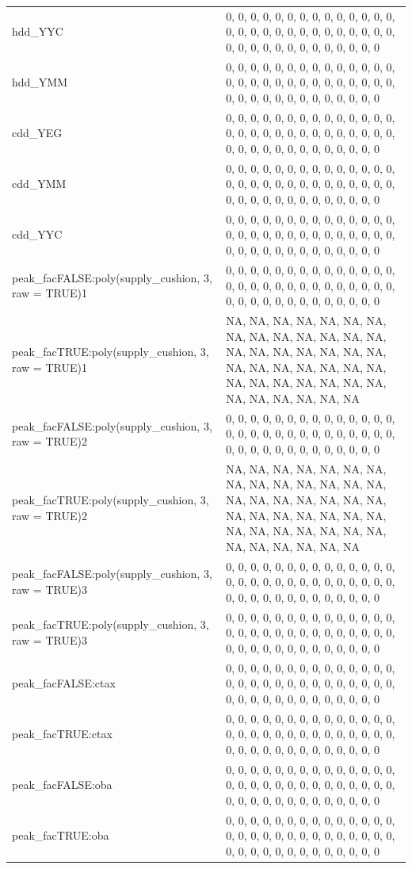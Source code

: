 \begin{table}
{\begin{tabular}[t]{ll}
hdd\_YYC & 0, 0, 0, 0, 0, 0, 0, 0, 0, 0, 0, 0, 0, 0, 0, 0, 0, 0, 0, 0, 0, 0, 0, 0, 0, 0, 0, 0, 0, 0, 0, 0, 0, 0, 0, 0, 0, 0, 0, 0, 0\\
hdd\_YMM & 0, 0, 0, 0, 0, 0, 0, 0, 0, 0, 0, 0, 0, 0, 0, 0, 0, 0, 0, 0, 0, 0, 0, 0, 0, 0, 0, 0, 0, 0, 0, 0, 0, 0, 0, 0, 0, 0, 0, 0, 0\\
cdd\_YEG & 0, 0, 0, 0, 0, 0, 0, 0, 0, 0, 0, 0, 0, 0, 0, 0, 0, 0, 0, 0, 0, 0, 0, 0, 0, 0, 0, 0, 0, 0, 0, 0, 0, 0, 0, 0, 0, 0, 0, 0, 0\\
cdd\_YMM & 0, 0, 0, 0, 0, 0, 0, 0, 0, 0, 0, 0, 0, 0, 0, 0, 0, 0, 0, 0, 0, 0, 0, 0, 0, 0, 0, 0, 0, 0, 0, 0, 0, 0, 0, 0, 0, 0, 0, 0, 0\\
\addlinespace
cdd\_YYC & 0, 0, 0, 0, 0, 0, 0, 0, 0, 0, 0, 0, 0, 0, 0, 0, 0, 0, 0, 0, 0, 0, 0, 0, 0, 0, 0, 0, 0, 0, 0, 0, 0, 0, 0, 0, 0, 0, 0, 0, 0\\
peak\_facFALSE:poly(supply\_cushion, 3, raw = TRUE)1 & 0, 0, 0, 0, 0, 0, 0, 0, 0, 0, 0, 0, 0, 0, 0, 0, 0, 0, 0, 0, 0, 0, 0, 0, 0, 0, 0, 0, 0, 0, 0, 0, 0, 0, 0, 0, 0, 0, 0, 0, 0\\
peak\_facTRUE:poly(supply\_cushion, 3, raw = TRUE)1 & NA, NA, NA, NA, NA, NA, NA, NA, NA, NA, NA, NA, NA, NA, NA, NA, NA, NA, NA, NA, NA, NA, NA, NA, NA, NA, NA, NA, NA, NA, NA, NA, NA, NA, NA, NA, NA, NA, NA, NA, NA\\
peak\_facFALSE:poly(supply\_cushion, 3, raw = TRUE)2 & 0, 0, 0, 0, 0, 0, 0, 0, 0, 0, 0, 0, 0, 0, 0, 0, 0, 0, 0, 0, 0, 0, 0, 0, 0, 0, 0, 0, 0, 0, 0, 0, 0, 0, 0, 0, 0, 0, 0, 0, 0\\
peak\_facTRUE:poly(supply\_cushion, 3, raw = TRUE)2 & NA, NA, NA, NA, NA, NA, NA, NA, NA, NA, NA, NA, NA, NA, NA, NA, NA, NA, NA, NA, NA, NA, NA, NA, NA, NA, NA, NA, NA, NA, NA, NA, NA, NA, NA, NA, NA, NA, NA, NA, NA\\
\addlinespace
peak\_facFALSE:poly(supply\_cushion, 3, raw = TRUE)3 & 0, 0, 0, 0, 0, 0, 0, 0, 0, 0, 0, 0, 0, 0, 0, 0, 0, 0, 0, 0, 0, 0, 0, 0, 0, 0, 0, 0, 0, 0, 0, 0, 0, 0, 0, 0, 0, 0, 0, 0, 0\\
peak\_facTRUE:poly(supply\_cushion, 3, raw = TRUE)3 & 0, 0, 0, 0, 0, 0, 0, 0, 0, 0, 0, 0, 0, 0, 0, 0, 0, 0, 0, 0, 0, 0, 0, 0, 0, 0, 0, 0, 0, 0, 0, 0, 0, 0, 0, 0, 0, 0, 0, 0, 0\\
peak\_facFALSE:ctax & 0, 0, 0, 0, 0, 0, 0, 0, 0, 0, 0, 0, 0, 0, 0, 0, 0, 0, 0, 0, 0, 0, 0, 0, 0, 0, 0, 0, 0, 0, 0, 0, 0, 0, 0, 0, 0, 0, 0, 0, 0\\
peak\_facTRUE:ctax & 0, 0, 0, 0, 0, 0, 0, 0, 0, 0, 0, 0, 0, 0, 0, 0, 0, 0, 0, 0, 0, 0, 0, 0, 0, 0, 0, 0, 0, 0, 0, 0, 0, 0, 0, 0, 0, 0, 0, 0, 0\\
peak\_facFALSE:oba & 0, 0, 0, 0, 0, 0, 0, 0, 0, 0, 0, 0, 0, 0, 0, 0, 0, 0, 0, 0, 0, 0, 0, 0, 0, 0, 0, 0, 0, 0, 0, 0, 0, 0, 0, 0, 0, 0, 0, 0, 0\\
\addlinespace
peak\_facTRUE:oba & 0, 0, 0, 0, 0, 0, 0, 0, 0, 0, 0, 0, 0, 0, 0, 0, 0, 0, 0, 0, 0, 0, 0, 0, 0, 0, 0, 0, 0, 0, 0, 0, 0, 0, 0, 0, 0, 0, 0, 0, 0\\
\bottomrule
\end{tabular}}
\end{table}
